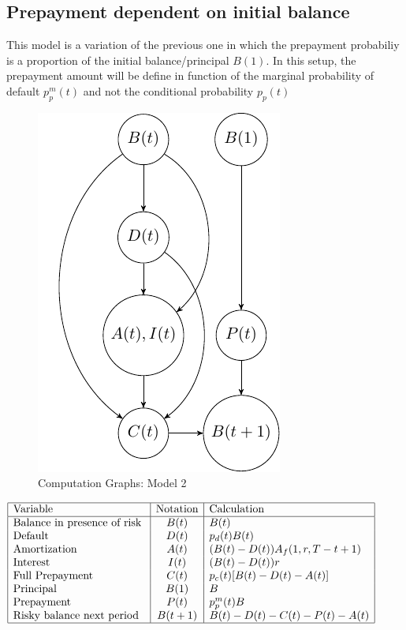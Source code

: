 \subsection{Prepayment dependent on initial balance}
This model is a variation of the previous one in which the prepayment probabiliy is a proportion of the initial balance/principal $B(1)$. In this setup, the prepayment amount will be define in function of the marginal probability of default $p^m_p(t)$ and not the conditional probability $p_p(t)$ 
\begin{figure}[H]
  \centering
      \includegraphics[width=.3\textwidth]{Graph1.pdf} 
 \caption{Computation Graphs: Model 2}
 \label{fig:Test}
\end{figure}

\begin{center} %
\begin{math}
\begin{array}{|l|c|l|} \hline %
\mbox{Variable} &\mbox{Notation} & \mbox{Calculation}\\ \hline
\mbox{Balance in presence of risk }  & B(t)  & B(t)\\
\mbox{Default  }  & D(t) & p_d(t) B(t)\\
\mbox{Amortization}  & A(t) &(B(t)-D(t)) A_f(1,r,T-t+1)\\
\mbox{Interest }  &  I(t) & (B(t)-D(t))r\\
\mbox{Full Prepayment}  & C(t) & p_c(t) [B(t)-D(t)-A(t)]\\
\mbox{Principal   }  &  B(1) & B\\
\mbox{Prepayment  }  & P(t) & p_p^m(t)B\\
\mbox{Risky balance next period  }  & B(t+1) & B(t)-D(t)-C(t)-P(t)-A(t)\\
\hline
\end{array} %
\end{math}
\end{center}

